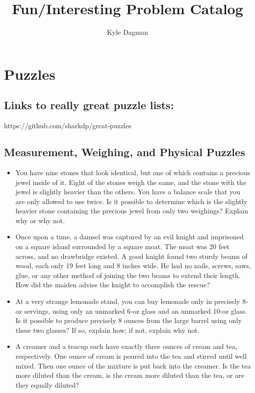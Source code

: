 \documentclass[12pt]{article}
\title{Fun/Interesting Problem Catalog}
\author{Kyle Dagman}
\begin{document}
\maketitle
\tableofcontents
\newpage

\section{Puzzles}

\subsection{Links to really great puzzle lists:}
https://github.com/sharkdp/great-puzzles

\subsection{Measurement, Weighing, and Physical Puzzles}
\begin{itemize}
  \item You have nine stones that look identical, but one of which contains a precious jewel inside of it. Eight of the stones weigh the same, and the stone with the jewel is slightly heavier than the others. You have a balance scale that you are only allowed to use twice. Is it possible to determine which is the slightly heavier stone containing the precious jewel from only two weighings? Explain why or why not.

  \item Once upon a time, a damsel was captured by an evil knight and imprisoned on a square island surrounded by a square moat. The moat was 20 feet across, and no drawbridge existed. A good knight found two sturdy beams of wood, each only 19 feet long and 8 inches wide. He had no nails, screws, saws, glue, or any other method of joining the two beams to extend their length. How did the maiden advise the knight to accomplish the rescue?

  \item At a very strange lemonade stand, you can buy lemonade only in precisely 8-oz servings, using only an unmarked 6-oz glass and an unmarked 10-oz glass. Is it possible to produce precisely 8 ounces from the large barrel using only these two glasses? If so, explain how; if not, explain why not.

  \item A creamer and a teacup each have exactly three ounces of cream and tea, respectively. One ounce of cream is poured into the tea and stirred until well mixed. Then one ounce of the mixture is put back into the creamer. Is the tea more diluted than the cream, is the cream more diluted than the tea, or are they equally diluted?
\end{itemize}
\end{document}
